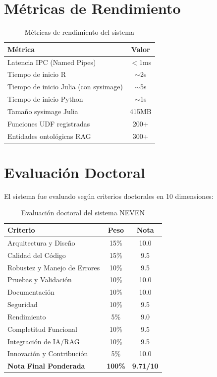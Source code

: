\documentclass[12pt, a4paper]{report}
\begin{document}
\section{Métricas de Rendimiento}

\begin{table}[H]
\centering
\begin{tabular}{lc}
\toprule
\textbf{Métrica} & \textbf{Valor} \\
\midrule
Latencia IPC (Named Pipes) & $<$1ms \\
Tiempo de inicio R & $\sim$2s \\
Tiempo de inicio Julia (con sysimage) & $\sim$5s \\
Tiempo de inicio Python & $\sim$1s \\
Tamaño sysimage Julia & 415MB \\
Funciones UDF registradas & 200+ \\
Entidades ontológicas RAG & 300+ \\
\bottomrule
\end{tabular}
\caption{Métricas de rendimiento del sistema}
\end{table}

\section{Evaluación Doctoral}

El sistema fue evaluado según criterios doctorales en 10 dimensiones:

\begin{table}[H]
\centering
\begin{tabular}{lcc}
\toprule
\textbf{Criterio} & \textbf{Peso} & \textbf{Nota} \\
\midrule
Arquitectura y Diseño & 15\% & 10.0 \\
Calidad del Código & 15\% & 9.5 \\
Robustez y Manejo de Errores & 10\% & 9.5 \\
Pruebas y Validación & 10\% & 10.0 \\
Documentación & 10\% & 10.0 \\
Seguridad & 10\% & 9.5 \\
Rendimiento & 5\% & 9.0 \\
Completitud Funcional & 10\% & 9.5 \\
Integración de IA/RAG & 10\% & 9.5 \\
Innovación y Contribución & 5\% & 10.0 \\
\midrule
\textbf{Nota Final Ponderada} & \textbf{100\%} & \textbf{9.71/10} \\
\bottomrule
\end{tabular}
\caption{Evaluación doctoral del sistema NEVEN}
\end{table}
\end{document}
